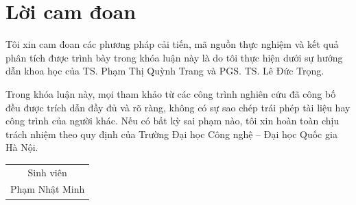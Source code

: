 \chapter*{Lời cam đoan}
Tôi xin cam đoan các phương pháp cải tiến, mã nguồn thực nghiệm và kết quả phân tích được trình bày trong khóa luận này là do tôi thực hiện dưới sự hướng dẫn khoa học của TS. Phạm Thị Quỳnh Trang và PGS. TS. Lê Đức Trọng.

Trong khóa luận này, mọi tham khảo từ các công trình nghiên cứu đã công bố đều được trích dẫn đầy đủ và rõ ràng, không có sự sao chép trái phép tài liệu hay công trình của người khác. Nếu có bất kỳ sai phạm nào, tôi xin hoàn toàn chịu trách nhiệm theo quy định của Trường Đại học Công nghệ -- Đại học Quốc gia Hà Nội.

\vspace{1cm}
\begin{flushright}
\begin{tabular}{@{}c@{}}
Sinh viên\\[1cm]
Phạm Nhật Minh
\end{tabular}
\end{flushright}

